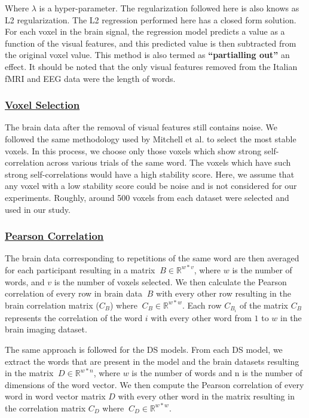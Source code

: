 Where $\lambda$ is a hyper-parameter. The regularization followed here is also knows as L2 regularization. The L2 regression performed here has a closed form solution. For each voxel in the brain signal, the regression model predicts a value as a function of the visual features, and this predicted value is then subtracted from the original voxel value.  This method is also termed as \textbf{``partialling out''} an effect. It should be noted that the only visual features removed from the Italian fMRI and EEG data were the length of words.
\subsubsection{\underline{Voxel Selection}}
The brain data after the removal of visual features still contains noise. We followed the same methodology used by Mitchell et al. \cite{Mitchell1191} to select the most stable voxels. In this process, we choose only those voxels which show strong self-correlation across various trials of the same word. The voxels which have such strong self-correlations would have a high stability score. Here, we assume that any voxel with a low stability score could be noise and is not considered for our experiments. Roughly, around 500 voxels from each dataset were selected and used in our study.

\subsubsection{\underline{Pearson Correlation}}
The brain data corresponding to repetitions of the same word are then averaged for each participant resulting in a matrix $\ B\in \mathbb{R} ^{w*v}$, where $w$ is the number of words, and $v$ is the number of voxels selected. We then calculate the Pearson correlation of every row in brain data $\ B$ with every other row resulting in the brain correlation matrix ($C_B$) where $\ C_B\in \mathbb{R} ^{w*w}$. Each row $C_{B_i}$ of the matrix $C_B$ represents the correlation of the word $i$ with every other word from $1$ to $w$ in the brain imaging dataset.

The same approach is followed for the DS models. From each DS model, we extract the words that are present in the model and the brain datasets resulting in the matrix $\ D\in \mathbb{R} ^{w*n}$, where $w$ is the number of words and n is the number of dimensions of the word vector. We then compute the Pearson correlation of every word in word vector matrix $D$ with every other word in the matrix resulting in the correlation matrix $C_D$ where $\ C_D\in \mathbb{R} ^{w*w} $.


